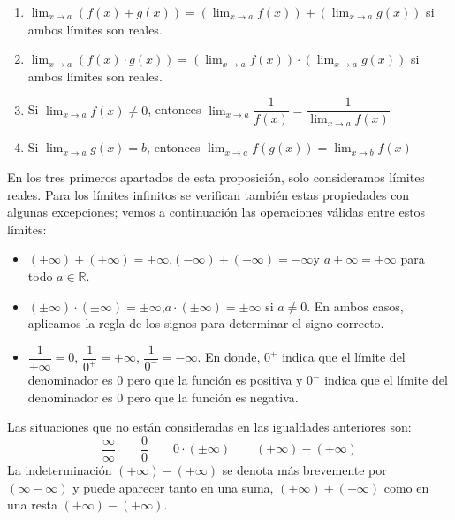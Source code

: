 \begin{proposicion-br}\label{pr:alg-lim}
\begin{enumerate}
\item
$\displaystyle\lim_{x\to a}(f(x)+g(x))=
(\lim_{x\to a}f(x))+(\lim_{x\to a}g(x))$ si ambos límites son reales.
\item $\displaystyle\lim_{x\to a}(f(x)\cdot g(x))=(\lim_{x\to a}f(x))\cdot(\lim_{x\to a}g(x))$ si ambos límites son reales.
\item Si $\displaystyle\lim_{x\to a}f(x)\ne0$, entonces
$\displaystyle\lim_{x\to a}\dfrac{1}{f(x)}=\dfrac{1}{\displaystyle\lim_{x\to a}f(x)}$
\item Si $\displaystyle\lim_{x\to a}g(x)=b$, entonces
$\displaystyle\lim_{x\to a}f(g(x))=\lim_{x\to b}f(x)$
\end{enumerate}
\end{proposicion-br}

En los tres primeros apartados de esta proposición, solo consideramos límites reales.
Para los límites infinitos se verifican también estas propiedades con algunas excepciones;
vemos a continuación las operaciones válidas entre estos límites:

\begin{itemize}
\item
$(+\infty)+(+\infty)=+\infty$,\quad$(-\infty)+(-\infty)=-\infty$\quad y \quad$a\pm\infty=\pm\infty$ para todo $a\in\mathbb{R}$.
\item
$(\pm\infty)\cdot(\pm\infty)=\pm\infty$,\quad$a\cdot(\pm\infty)=\pm\infty$ si $a\ne0$. En ambos casos, aplicamos la
regla de los signos para determinar el signo correcto.
\item
$\dfrac1{\pm\infty} = 0$,\quad
$\dfrac1{0^+} = +\infty$,\quad
$\dfrac1{0^-} = -\infty$. En donde, $0^+$ indica que el límite del denominador es 0 pero que la función es positiva y $0^-$ indica que el límite del denominador es 0 pero que la función es negativa. 
\end{itemize}
%
Las situaciones que no están consideradas en las igualdades anteriores son:
\[
\frac{\infty}{\infty}\qquad \frac00\qquad
0\cdot(\pm\infty)\qquad (+\infty)-(+\infty)%
\]
La indeterminación $(+\infty)-(+\infty)$ se denota más brevemente por $(\infty-\infty)$ y puede aparecer tanto en una suma, $(+\infty)+(-\infty)$ como en una resta $(+\infty)-(+\infty)$.

